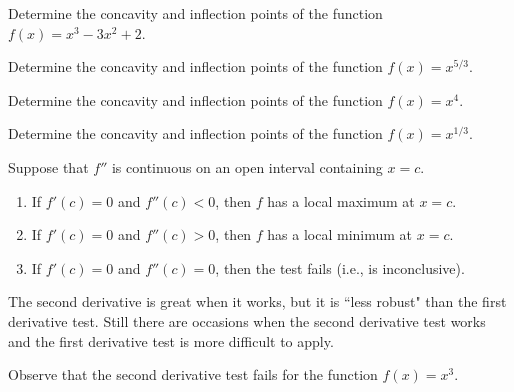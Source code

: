 \begin{example}
Determine the concavity and inflection points of the function $f(x) = x^3-3x^2+2$.
\end{example}

\vfill

\begin{example}
Determine the concavity and inflection points of the function $f(x) =x^{5/3}$.
\end{example}

\vfill

\newpage

\begin{example}
Determine the concavity and inflection points of the function $f(x) = x^4$.
\end{example}

\vfill

\begin{example}
Determine the concavity and inflection points of the function $f(x) =x^{1/3}$.
\end{example}

\vfill

\newpage

\begin{theorem}
Suppose that $f''$ is continuous on an open interval containing $x=c$.
\begin{enumerate}
\item If $f'(c)=0$ and $f''(c)<0$, then $f$ has a local maximum at $x=c$.
\item If $f'(c)=0$ and $f''(c)>0$, then $f$ has a local minimum at $x=c$.
\item If $f'(c)=0$ and $f''(c)=0$, then the test fails (i.e., is inconclusive).
\end{enumerate}
\end{theorem}
\begin{remark}
The second derivative is great when it works, but it is ``less robust" than the first derivative test.
Still there are occasions when the second derivative test works and the first derivative test is more difficult to apply.
\end{remark}

\begin{example}
Observe that the second derivative test fails for the function $f(x)=x^3$.
\end{example}

\vfill

